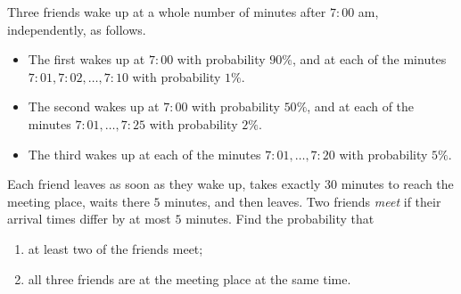 Three friends wake up at a whole number of minutes after $7{:}00$ am, independently, as follows.
\begin{itemize}
\item The first wakes up at $7{:}00$ with probability $90\%$, and at each of the minutes $7{:}01,7{:}02,\dots,7{:}10$ with probability $1\%$.
\item The second wakes up at $7{:}00$ with probability $50\%$, and at each of the minutes $7{:}01,\dots,7{:}25$ with probability $2\%$.
\item The third wakes up at each of the minutes $7{:}01,\dots,7{:}20$ with probability $5\%$.
\end{itemize}
Each friend leaves as soon as they wake up, takes exactly $30$ minutes to reach the meeting place, waits there $5$ minutes, and then leaves. Two friends \emph{meet} if their arrival times differ by at most $5$ minutes. Find the probability that
\begin{enumerate}
\item[(1)] at least two of the friends meet;
\item[(2)] all three friends are at the meeting place at the same time.
\end{enumerate}
